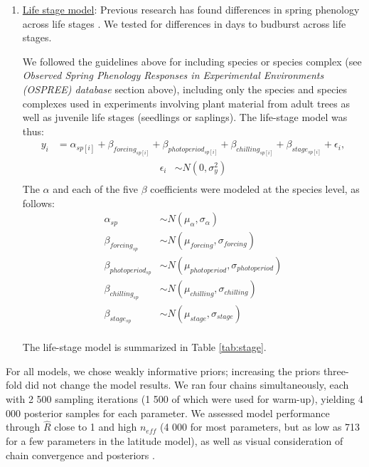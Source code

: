 \documentclass{article}
\begin{document}
\begin{enumerate}
\item \underline{Life stage model}:
Previous research has found differences in spring phenology across life stages \emph{\citep[e.g.{\normalfont, juvenile versus adult trees}][]{vitasse2013ont}}. We tested for differences in days to budburst across life stages. 
\par We followed the guidelines above for including species or species complex (see \emph{Observed Spring Phenology Responses in Experimental Environments (OSPREE) database} section above), including only the species and species complexes used in experiments involving plant material from adult trees as well as juvenile life stages (seedlings or saplings). The life-stage model was thus:
\begin{align*}
y_i &= \alpha_{sp[i]} + \beta_{forcing_{sp[i]}} + \beta_{photoperiod_{sp[i]}} + \beta_{chilling_{sp[i]}} + \beta_{stage_{sp[i]}} + \epsilon_{i},
\end{align*}
\begin{align*}
\epsilon_i & \sim N(0,\sigma^2_y) \\
\end{align*}
\noindent The $\alpha$ and each of the five $\beta$ coefficients were modeled at the species level, as follows:
\begin{align*}
\alpha_{sp} & \sim N(\mu_{\alpha}, \sigma_{\alpha}) \\
\beta_{forcing_{sp}} & \sim N(\mu_{forcing}, \sigma_{forcing}) \\
\beta_{photoperiod_{sp}} & \sim N(\mu_{photoperiod}, \sigma_{photoperiod})\\
\beta_{chilling_{sp}} & \sim N(\mu_{chilling}, \sigma_{chilling})\\
\beta_{stage_{sp}} & \sim N(\mu_{stage}, \sigma_{stage})\\
\end{align*}
\par The life-stage model is summarized in Table \ref{tab:stage}.

\end{enumerate}
\noindent For all models, we chose weakly informative priors; increasing the priors three-fold did not change the model results. We ran four chains simultaneously, each with 2 500 sampling iterations (1 500 of which were used for warm-up), yielding 4 000 posterior samples for each parameter. We assessed model performance through $\hat{R}$ close to 1 and high $n_{eff}$ (4 000 for most parameters, but as low as 713 for a few parameters in the latitude model), as well as visual consideration of chain convergence and posteriors \emph{\citep{BDA}}. 
\end{document}
